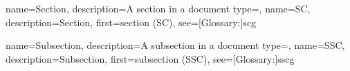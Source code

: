 {
	name={Section},
	description={A section in a document}
}
{
	type=\acronymtype,
	name={SC},
	description={Section},
	first={section (SC)},
	see=[Glossary:]{scg}
}

{
	name={Subsection},
	description={A subsection in a document}
}
{
	type=\acronymtype,
	name={SSC},
	description={Subsection},
	first={subsection (SSC)},
	see=[Glossary:]{sscg}
}